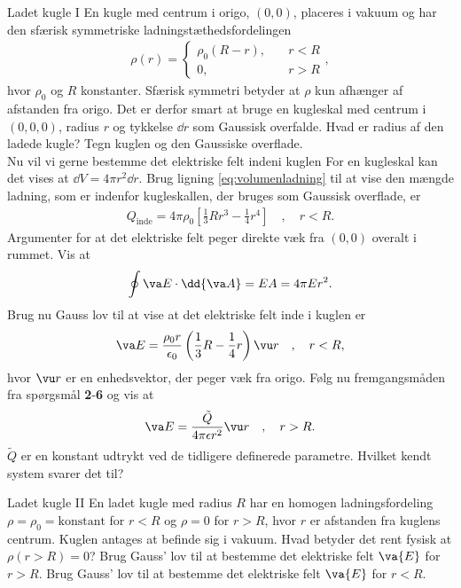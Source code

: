 \begin{opgave}{Ladet kugle I}
    En kugle med centrum i origo, $(0,0)$, placeres i vakuum og har den sfærisk symmetriske ladningstæthedsfordelingen
    \begin{align*}
        \rho(r) = \begin{cases} \rho_0(R - r), \quad &r<R \\
        0, \qquad &r>R
        \end{cases} ,
    \end{align*}
    hvor $\rho_0$ og $R$ konstanter. Sfærisk symmetri betyder at $\rho$ kun afhænger af afstanden fra origo. Det er derfor smart at bruge en kugleskal med centrum i $(0,0,0)$, radius $r$ og tykkelse $\dd{r}$ som Gaussisk overfalde.
    \opg Hvad er radius af den ladede kugle?
    \opg Tegn kuglen og den Gaussiske overflade. \\[5mm]
    Nu vil vi gerne bestemme det elektriske felt indeni kuglen
    \opg For en kugleskal kan det vises at $\dd{V} = 4\pi r^2 \dd{r}$. Brug ligning \eqref{eq:volumenladning} til at vise den mængde ladning, som er indenfor kugleskallen, der bruges som Gaussisk overflade, er
    \begin{align*}
        Q_\mathrm{inde} = 4\pi\rho_0\left[\frac{1}{3}Rr^3 - \frac{1}{4}r^4 \right] \quad , \quad r<R.
    \end{align*}
    \opg Argumenter for at det elektriske felt peger direkte væk fra $(0,0)$ overalt i rummet.
    \opg Vis at
    \begin{align*}
        \oint \va E \cdot \dd{\va A} = EA = 4\pi E r^2.
    \end{align*}
    \opg Brug nu Gauss lov til at vise at det elektriske felt inde i kuglen er
    \begin{align*}
        \va E = \frac{\rho_0r}{\epsilon_0}\left(\frac{1}{3}R - \frac{1}{4}r\right)\vu r \quad , \quad r<R,
    \end{align*}
    hvor $\vu r$ er en enhedsvektor, der peger væk fra origo.
    \opg Følg nu fremgangsmåden fra spørgsmål \textbf{2}-\textbf{6} og vis at
    \begin{align*}
        \va E = \frac{\tilde{Q}}{4\pi \epsilon r^2}\vu r \quad , \quad r>R.
    \end{align*}
    $\tilde{Q}$ er en konstant udtrykt ved de tidligere definerede parametre.
    \opg Hvilket kendt system svarer det til?
\end{opgave}

\begin{opgave}{Ladet kugle II}
    En ladet kugle med radius $R$ har en homogen ladningsfordeling $\rho=\rho_0=\text{konstant}$ for $r<R$ og $\rho=0$ for $r>R$, hvor $r$ er afstanden fra kuglens centrum. Kuglen antages at befinde sig i vakuum.
    \opg Hvad betyder det rent fysisk at $\rho(r>R) = 0$?
    \opg Brug Gauss' lov til at bestemme det elektriske felt $\va{E}$ for $r>R$.
    \opg Brug Gauss' lov til at bestemme det elektriske felt $\va{E}$ for $r<R$.
\end{opgave}

